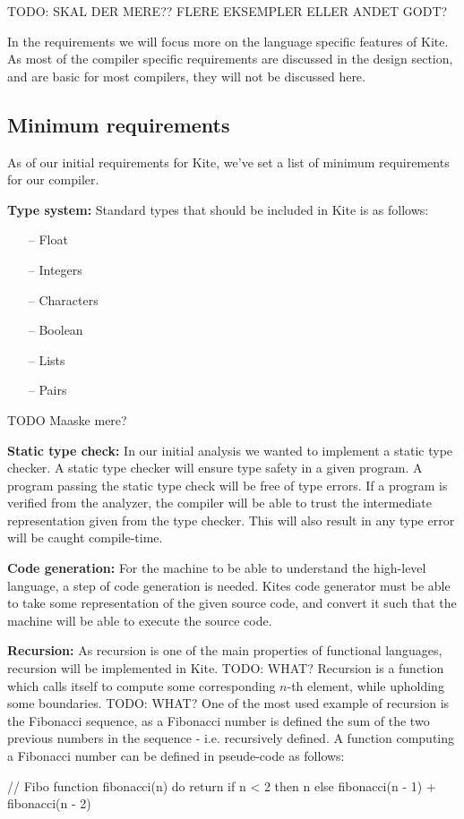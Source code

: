 TODO: SKAL DER MERE?? FLERE EKSEMPLER ELLER ANDET GODT?

In the requirements we will focus more on the language specific features of
Kite. As most of the compiler specific requirements are discussed in
the design section, and are basic for most compilers, they will not
be discussed here. 

\subsection{Minimum requirements}
As of our initial requirements for Kite, we've set a list of minimum
requirements for our compiler.

\textbf{Type system:} Standard types that should be included in Kite is as
follows:
\begin{itemize}
\item [--] Float
\item [--] Integers
\item [--] Characters
\item [--] Boolean
\item [--] Lists
\item [--] Pairs
\end{itemize}
TODO Maaske mere? 

\textbf{Static type check:} In our initial analysis we wanted to
implement a static type checker. A static type checker will ensure
type safety in a given program. A program passing the static type
check will be free of type errors. If a program is verified from the
analyzer, the compiler will be able to trust the intermediate
representation given from the type checker. This will also result in
any type error will be caught compile-time.

\textbf{Code generation:} For the machine to be able to understand the
high-level language, a step of code generation is needed. Kites code
generator must be able to take some representation of the given source
code, and convert it such that the machine will be able to execute the
source code.

\textbf{Recursion:} As recursion is one of the main properties of
functional languages, recursion will be implemented in Kite. TODO: WHAT? Recursion
is a function which calls itself to compute some corresponding $n$-th
element, while upholding some boundaries. TODO: WHAT?
One of the most used example of recursion is the Fibonacci sequence, as a Fibonacci number is defined the sum of the two previous numbers in the sequence - i.e. recursively defined. A function computing a Fibonacci number can be defined in pseude-code as follows:
\begin{pseudo}
// Fibo
function fibonacci(n) do
  return if n < 2
    then n
    else fibonacci(n - 1) + fibonacci(n - 2)
\end{pseudo}

